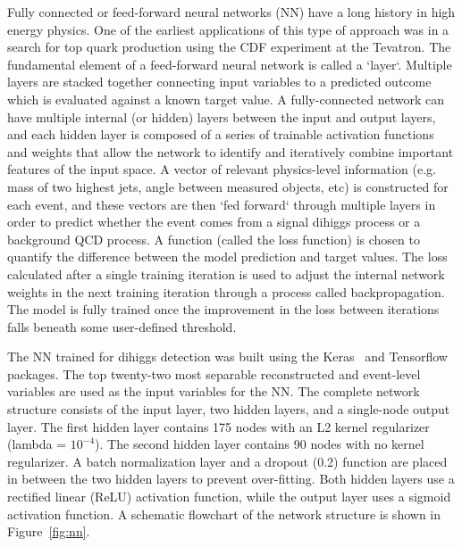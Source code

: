 \label{sec:NN}
Fully connected or feed-forward neural networks (NN) have a long history in high energy physics. One of the earliest applications of this type of approach was in a search for top quark production using the CDF experiment at the Tevatron. The fundamental element of a feed-forward neural network is called a `layer`. Multiple layers are stacked together connecting input variables to a predicted outcome which is evaluated against a known target value. A fully-connected network can have multiple internal (or hidden) layers between the input and output layers, and each hidden layer is composed of a series of trainable activation functions and weights that allow the network to identify and iteratively combine important features of the input space. A vector of relevant physics-level information (e.g. mass of two highest \pt jets, angle between measured objects, etc) is constructed for each event, and these vectors are then `fed forward` through multiple layers in order to predict whether the event comes from a signal dihiggs process or a background QCD process. A function (called the loss function) is chosen to quantify the difference between the model prediction and target values. The loss calculated after a single training iteration is used to adjust the internal network weights in the next training iteration through a process called backpropagation. The model is fully trained once the improvement in the loss between iterations falls beneath some user-defined threshold.

The NN trained for dihiggs detection was built using the Keras~\cite{chollet2015keras} and Tensorflow~\cite{tensorflow} packages. The top twenty-two most separable reconstructed and event-level variables are used as the input variables for the NN. The complete network structure consists of the input layer, two hidden layers, and a single-node output layer. The first hidden layer contains 175 nodes with an L2 kernel regularizer (lambda = $10^{-4}$). The second hidden layer contains 90 nodes with no kernel regularizer. A batch normalization layer and a dropout (0.2) function are placed in between the two hidden layers to prevent over-fitting. Both hidden layers use a rectified linear (ReLU) activation function, while the output layer uses a sigmoid activation function. A schematic flowchart of the network structure is shown in Figure~\ref{fig:nn}.

